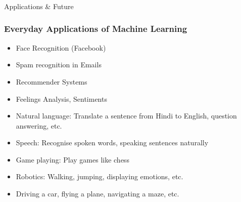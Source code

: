 


\begin{frame}[fragile]\frametitle{}
\begin{center}
{\Large Applications \& Future }
\end{center}
\end{frame}


\begin{frame}[fragile]\frametitle{Everyday Applications of Machine Learning}
\begin{itemize}
\item Face Recognition (Facebook)
\item Spam recognition in Emails
\item Recommender Systems
\item Feelings Analysis, Sentiments
\item Natural language: Translate a sentence from Hindi to English, 
question answering, etc. 
\item Speech: Recognise spoken words, speaking sentences naturally 
\item Game playing: Play games like chess 
\item Robotics: Walking, jumping, displaying emotions, etc. 
\item Driving a car, flying a plane, navigating a maze, etc.
\end{itemize}
\end{frame}


